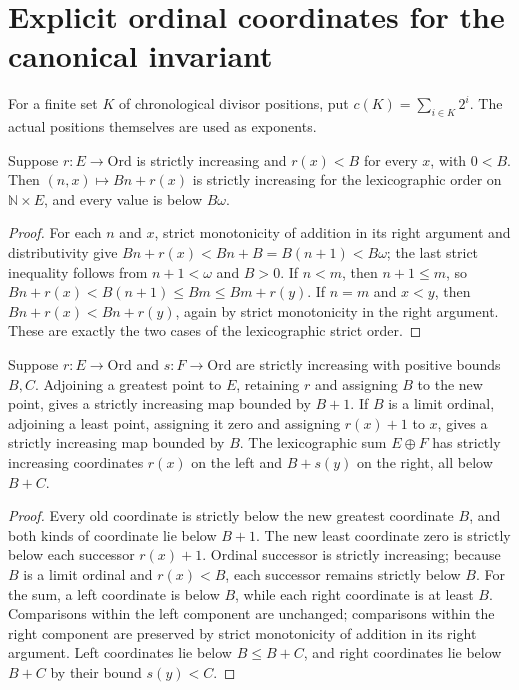 \section{Explicit ordinal coordinates for the canonical invariant}

\begin{definition}
\label{hir:disjoint-invariant-ordinal-colex}
\leanok
For a finite set $K$ of chronological divisor positions, put
$c(K)=\sum_{i\in K}2^i$. The actual positions themselves are used as exponents.
\end{definition}

\begin{lemma}
\label{hir:disjoint-invariant-ordinal-blocks}
Suppose $r:E\longrightarrow\mathrm{Ord}$ is strictly increasing and
$r(x)<B$ for every $x$, with $0<B$. Then
$(n,x)\longmapsto Bn+r(x)$ is strictly increasing for the lexicographic
order on $\mathbb N\times E$, and every value is below $B\omega$.
\end{lemma}
\begin{proof}
For each $n$ and $x$, strict monotonicity of addition in its right argument
and distributivity give
$Bn+r(x)<Bn+B=B(n+1)<B\omega$; the last strict inequality follows from
$n+1<\omega$ and $B>0$. If $n<m$, then $n+1\le m$, so
$Bn+r(x)<B(n+1)\le Bm\le Bm+r(y)$. If $n=m$ and $x<y$, then
$Bn+r(x)<Bn+r(y)$, again by strict monotonicity in the right argument.
These are exactly the two cases of the lexicographic strict order.
\end{proof}

\begin{lemma}
\label{hir:disjoint-invariant-ordinal-endpoints}
Suppose $r:E\longrightarrow\mathrm{Ord}$ and $s:F\longrightarrow\mathrm{Ord}$
are strictly increasing with positive bounds $B,C$. Adjoining a greatest
point to $E$, retaining $r$ and assigning $B$ to the new point, gives a
strictly increasing map bounded by $B+1$. If $B$ is a limit ordinal,
adjoining a least point, assigning it zero and assigning $r(x)+1$ to $x$,
gives a strictly increasing map bounded by $B$. The lexicographic sum
$E\mathbin{\oplus}F$ has strictly increasing coordinates $r(x)$ on the
left and $B+s(y)$ on the right, all below $B+C$.
\end{lemma}
\begin{proof}
Every old coordinate is strictly below the new greatest coordinate $B$,
and both kinds of coordinate lie below $B+1$. The new least coordinate
zero is strictly below each successor $r(x)+1$. Ordinal successor is
strictly increasing; because $B$ is a limit ordinal and $r(x)<B$, each
successor remains strictly below $B$. For the sum, a left coordinate is
below $B$, while each right coordinate is at least $B$. Comparisons
within the left component are unchanged; comparisons within the right
component are preserved by strict monotonicity of addition in its right
argument. Left coordinates lie below $B\le B+C$, and right coordinates
lie below $B+C$ by their bound $s(y)<C$.
\end{proof}

